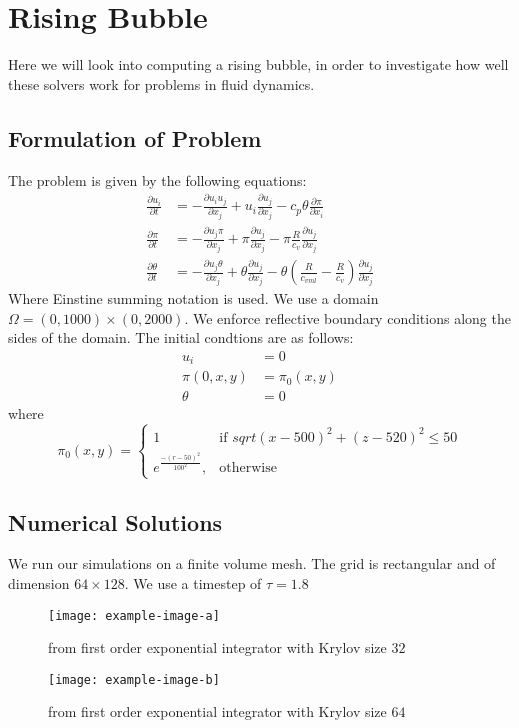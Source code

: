 \section{Rising Bubble}

Here we will look into computing a rising bubble, in order to investigate how well these solvers work for problems in fluid dynamics.
\subsection{Formulation of Problem}
The problem is given by the following equations\cite{Bryan2002}:
\begin{align*}
    \frac{\partial u_i}{\partial t} &= -\frac{\partial u_i u_j}{\partial x_j} + u_i\frac{\partial u_j}{\partial x_j} - c_p \theta \frac{\partial \pi}{\partial x_i} \\
    \frac{\partial \pi}{\partial t} &= -\frac{\partial u_j \pi}{\partial x_j} + \pi\frac{\partial u_j}{\partial x_j} - \pi \frac{R}{c_v}\frac{\partial u_j}{\partial x_j} \\
    \frac{\partial \theta}{\partial t} &= -\frac{\partial u_j \theta}{\partial x_j} + \theta\frac{\partial u_j}{\partial x_j} - \theta (\frac{R}{c_{vml}} - \frac{R}{c_v})\frac{\partial u_j}{\partial x_j}
\end{align*}
Where Einstine summing notation is used.
We use a domain $\Omega = (0,1000) \times (0,2000)$.
We enforce reflective boundary conditions along the sides of the domain.
The initial condtions are as follows:
\begin{align*}
    u_i &= 0\\
    \pi(0,x,y) &= \pi_0(x,y)\\
    \theta &= 0
\end{align*}
where
\[
    \pi_0(x,y)= 
\begin{cases}
    1& \text{if } sqrt{(x-500)^2+(z-520)^2}\leq 50\\
    e^{ \frac{-(r-50)^2}{100^2}},              & \text{otherwise}
\end{cases}
\]
\subsection{Numerical Solutions}
We run our simulations on a finite volume mesh.
The grid is rectangular and of dimension $64\times 128$.
We use a timestep of $\tau = 1.8$

\begin{figure}[H]
    \centering
    \begin{minipage}{0.49\textwidth}
        \texttt{[image: example-image-a]} %
        \caption{from first order exponential integrator with Krylov size $32$}
        \label{fig:first order 8 0.5}
    \end{minipage}\hfill
    \centering
    \begin{minipage}{0.49\textwidth}
        \texttt{[image: example-image-b]} %
        \caption{from first order exponential integrator with Krylov size $64$}
        \label{fig:first order 10 0.5}
    \end{minipage}\hfill
\end{figure}